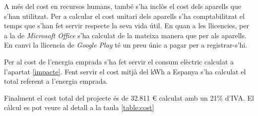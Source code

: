 A més del cost en recursos humans, també s'ha inclòs el cost dels aparells que s'han utilitzat. Per a calcular el cost unitari dels aparells s'ha comptabilitzat el temps que s'han fet servir respecte la seva vida útil. En quan a les llicencies, per a la de \textit{Microsoft Office} s'ha calculat de la mateixa manera que per als aparells. En canvi la llicencia de \textit{Google Play} té un preu únic a pagar per a registrar-s'hi. 

Per al cost de l'energia emprada s'ha fet servir el consum elèctric calculat a l'apartat \ref{impacte}. Fent servir el cost mitjà del kWh a Espanya s'ha calculat el total referent a l'energia emprada.

Finalment el cost total del projecte és de 32.811 \euro { calculat} amb un 21\% d'IVA. El càlcul es pot veure al detall a la taula \ref{table:cost}


